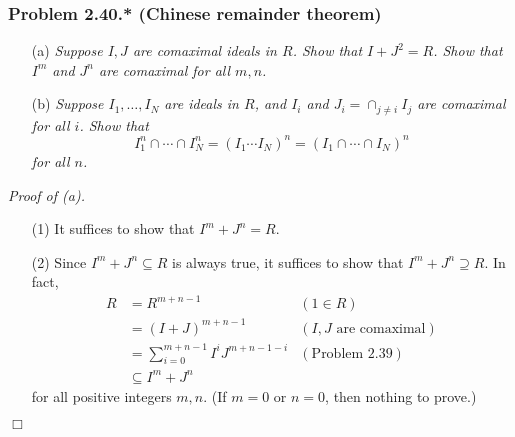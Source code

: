 \documentclass{article}
\begin{document}



\subsubsection*{Problem 2.40.* (Chinese remainder theorem)}
\begin{enumerate}
\item[(a)]
  \emph{Suppose $I, J$ are comaximal ideals in $R$.
  Show that $I + J^2 = R$. Show that $I^m$ and $J^n$ are comaximal for all $m, n$.}

\item[(b)]
  \emph{Suppose $I_1, \ldots, I_N$ are ideals in $R$,
  and $I_i$ and $J_i = \cap_{j \neq i} I_j$ are comaximal for all $i$.
  Show that
  \[
    I_1^{n} \cap \cdots \cap I_N^{n}
    = (I_1 \cdots I_N)^{n}
    = (I_1 \cap \cdots \cap I_N)^{n}
  \]
  for all $n$.} \\
\end{enumerate}



\emph{Proof of (a).}
\begin{enumerate}
\item[(1)]
  It suffices to show that $I^m + J^n = R$.

\item[(2)]
  Since $I^m + J^n \subseteq R$ is always true,
  it suffices to show that $I^m + J^n \supseteq R$.
  In fact,
  \begin{align*}
    R
    &= R^{m+n-1}
      &(1 \in R) \\
    &= (I+J)^{m+n-1}
      &(\text{$I, J$ are comaximal}) \\
    &= \sum_{i=0}^{m+n-1} I^i J^{m+n-1-i}
      &(\text{Problem 2.39}) \\
    &\subseteq I^m + J^n
  \end{align*}
  for all positive integers $m, n$.
  (If $m = 0$ or $n = 0$, then nothing to prove.)
\end{enumerate}
$\Box$ \\
\end{document}
